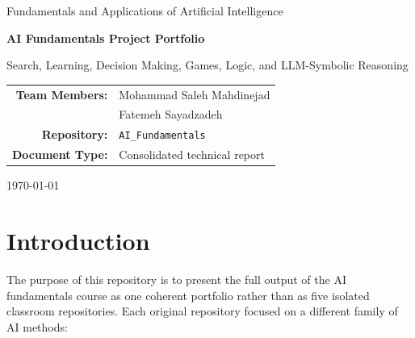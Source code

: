 \documentclass[11pt,a4paper]{article}
\newcommand{\code}[1]{\texttt{#1}}
\begin{document}
\begin{titlepage}
    \centering
    \vspace*{1.2cm}
    {\Large Fundamentals and Applications of Artificial Intelligence\par}
    \vspace{1.0cm}
    {\Huge\bfseries AI Fundamentals Project Portfolio\par}
    \vspace{0.4cm}
    {\Large Search, Learning, Decision Making, Games, Logic, and LLM-Symbolic Reasoning\par}
    \vspace{1.5cm}
    \begin{tabular}{rl}
        \textbf{Team Members:} & Mohammad Saleh Mahdinejad \\
                               & Fatemeh Sayadzadeh \\
        \textbf{Repository:}   & \code{AI\_Fundamentals} \\
        \textbf{Document Type:} & Consolidated technical report \\
    \end{tabular}
    \vfill
    {\large \today\par}
\end{titlepage}

\begin{abstract}
This report documents a consolidated portfolio of five artificial intelligence course projects. The projects begin with classical graph search and optimization, continue through regression, local search, Markov decision processes, reinforcement learning, and adversarial games, and end with first-order logic and hybrid LLM-symbolic reasoning. The final repository was built by reviewing the original assignment repositories, preserving the executable code and required assets, removing classroom metadata and temporary artifacts, cleaning sensitive configuration, and writing a single professional documentation layer around the complete body of work.
\end{abstract}

\tableofcontents
\newpage

\section{Introduction}

The purpose of this repository is to present the full output of the AI fundamentals course as one coherent portfolio rather than as five isolated classroom repositories. Each original repository focused on a different family of AI methods:
\end{document}
